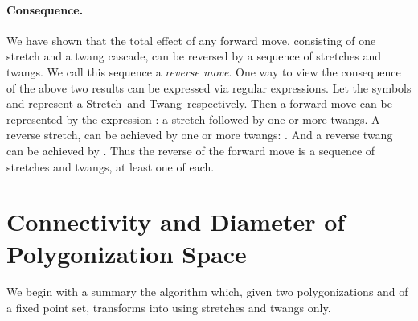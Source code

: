 \pdfoutput=1  \documentclass{article}
\def\st{{\sc Stretch}}
\def\tw{{\sc Twang}}
\newcommand{\seclab}[1]{\label{sec:#1}}
\begin{document}
\vspace{-0.5em}
\paragraph{Consequence.}
We have shown that the total effect of any forward move, consisting
of one stretch and a twang cascade, can be reversed by a sequence of
stretches and twangs. We call this sequence a \emph{reverse
move}. One way to view the consequence of the above two results can
be expressed via regular expressions. Let the symbols  and 
represent a \st\ and \tw\ respectively. Then a forward move can be
represented by the expression : a stretch followed by
one or more twangs. A reverse stretch,  can be achieved by one or more twangs:
. And
a reverse twang  can be achieved by . Thus the
reverse of the forward move  is  a sequence of stretches and twangs, at least one of each.


\vspace{-0.5em}
\section{Connectivity and Diameter of Polygonization Space}
\seclab{Connectivity}
We begin with a summary the algorithm which, given two polygonizations 
and  of a fixed point set, transforms  into  using
stretches and twangs only.

\vspace{-0.2em}
\begin{center}
\vspace{1mm} \vspace{1mm}
\end{center}
\end{document}
